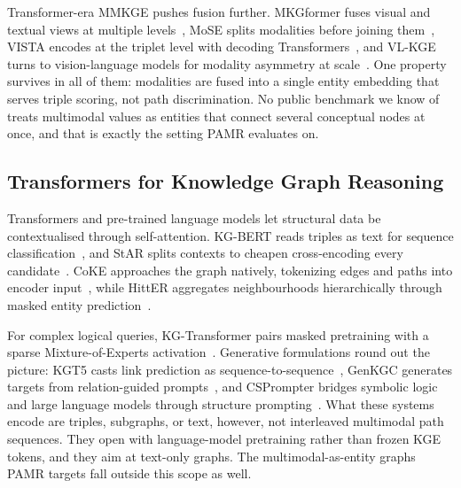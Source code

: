 \documentclass[runningheads]{llncs}
\begin{document}
Transformer-era MMKGE pushes fusion further. MKGformer fuses visual and textual views at multiple levels~\cite{chen2022mkgformer}, MoSE splits modalities before joining them~\cite{zhao2022mose}, VISTA encodes at the triplet level with decoding Transformers~\cite{lee2023vista}, and VL-KGE turns to vision-language models for modality asymmetry at scale~\cite{efthymiou2026vlkge}. One property survives in all of them: modalities are fused into a single entity embedding that serves triple scoring, not path discrimination. No public benchmark we know of treats multimodal values as entities that connect several conceptual nodes at once, and that is exactly the setting PAMR evaluates on.

\subsection{Transformers for Knowledge Graph Reasoning}
\label{sec:rw-transformers}

Transformers and pre-trained language models let structural data be contextualised through self-attention. KG-BERT reads triples as text for sequence classification~\cite{yao2019kg}, and StAR splits contexts to cheapen cross-encoding every candidate~\cite{wang2021star}. CoKE approaches the graph natively, tokenizing edges and paths into encoder input~\cite{wang2019coke}, while HittER aggregates neighbourhoods hierarchically through masked entity prediction~\cite{chen2021hitter}.

For complex logical queries, KG-Transformer pairs masked pretraining with a sparse Mixture-of-Experts activation~\cite{liu2022mask}. Generative formulations round out the picture: KGT5 casts link prediction as sequence-to-sequence~\cite{saxena2022kgt5}, GenKGC generates targets from relation-guided prompts~\cite{zhu2022genkgc}, and CSPrompter bridges symbolic logic and large language models through structure prompting~\cite{chen2023csprompter}. What these systems encode are triples, subgraphs, or text, however, not interleaved multimodal path sequences. They open with language-model pretraining rather than frozen KGE tokens, and they aim at text-only graphs. The multimodal-as-entity graphs PAMR targets fall outside this scope as well.

\end{document}
